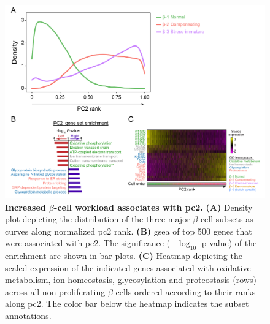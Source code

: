 \begin{figure}[t]
\centering
\includegraphics[width=\linewidth]{Chapter5/Fig/F3-6-03}
\caption[Increased $\beta$-cell workload associates with 2]{\textbf{Increased $\beta$-cell workload associates with \gls{pc}2.} \textbf{(A)} Density plot depicting the distribution of the three major $\beta$-cell subsets as curves along normalized \gls{pc}2 rank. \textbf{(B)} \gls{gsea} of top 500 genes that were associated with \gls{pc}2. The significance ($-\log_{10}$ p-value) of the enrichment are shown in bar plots. \textbf{(C)} Heatmap depicting the scaled expression of the indicated genes associated with oxidative metabolism, ion homeostasis, glycosylation and proteostasis (rows) across all non-proliferating $\beta$-cells ordered according to their ranks along \gls{pc}2. The color bar below the heatmap indicates the subset annotations.}
\label{fig:chp3_pc2}
\end{figure}


